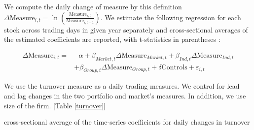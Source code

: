 \documentclass[12pt, a4paper]{article}
\begin{document}
 We compute the daily change of measure by this definition $ \Delta \text{Measure}_{i,t} = \ln(\frac{\text{Measure}_{i,t}}{\text{Measure}_{i,t-1}}) $. 
We estimate the following regression for each stock across trading days in given year separately and cross-sectional averages of the estimated coefficients are reported, with t-statistics in parentheses :

\begin{equation*}
	\begin{split}
			\Delta \text{Measure}_{i,t} =  & \text{	}\alpha + \beta_{Market,t} \Delta \text{Measure}_{Market,t}  
		+ \beta_{Ind,t} \Delta \text{Measure}_{Ind,t} \\ & + \beta_{Group,t} \Delta \text{Measure}_{Group,t} + \delta\text{Controls} + \varepsilon_{i,t}
	\end{split}
\end{equation*}

We use the turnover measure as a daily trading measures. We control for lead and lag changes in the two portfolio  and market's measures. In addition, we use size of the firm. [Table \ref{turnover}]

	\begin{table}[htbp]
	\centering
	\caption{cross-sectional average of the time-series coefficients for daily changes in turnover }
	\resizebox{0.7\textheight}{!}{
		
	} \label{turnover}
\end{table}


%		
\end{document}
